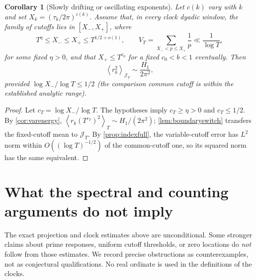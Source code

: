 \documentclass[11pt,reqno]{amsart}
\numberwithin{equation}{section}
\newtheorem{corollary}[theorem]{Corollary}
\newcommand{\av}[1]{\left\langle #1\right\rangle_T}
\newcommand{\avgJ}[1]{\left\langle #1\right\rangle_{\mathcal J_T}}
\begin{document}
\begin{corollary}[Slowly drifting or oscillating exponents]\label{cor:indexvariableleading}
Let $c(k)$ vary with $k$ and set $X_k=(\tau_k/2\pi)^{c(k)}$.
Assume that, in every clock dyadic window, the family of cutoffs
lies in $[X_-,X_+]$, where
\begin{equation}\label{eq:indexvarycond}
T^{\eta}\le X_-\le X_+\le T^{1/2+o(1)},
\qquad V_T=\sum_{X_-<p\le X_+}\frac1p\ll\frac1{\log T},
\end{equation}
for some fixed $\eta>0$, and that $X_+\le T^{c_0}$ for a fixed
$c_0<b<1$ eventually. Then
\begin{equation}\label{eq:indexvariableleading}
\avgJ{r_k^2}\sim\frac{H_1}{2\pi^2},
\end{equation}
provided $\log X_-/\log T\le1/2$ (the comparison common cutoff
is within the established analytic range).
\end{corollary}
\begin{proof}
Let $c_T=\log X_-/\log T$. The hypotheses imply
$c_T\ge\eta>0$ and $c_T\le1/2$.
By \cref{cor:varenergy}, $\av{r_k(T^{c_T})^2}\sim H_1/(2\pi^2)$;
\cref{lem:boundaryswitch} transfers the fixed-cutoff mean to
$\mathcal J_T$. By \cref{prop:indexfull}, the variable-cutoff
error has $L^2$ norm within $O((\log T)^{-1/2})$ of the common-cutoff
one, so its squared norm has the same equivalent.
\end{proof}




\section{What the spectral and counting arguments do not imply}
\label{sec:boundaries}
The exact projection and clock estimates above are unconditional. Some stronger
claims about prime responses, uniform cutoff thresholds, or zero locations do
\emph{not} follow from those estimates. We record precise obstructions as
counterexamples, not as conjectural qualifications. No real ordinate is used
in the definitions of the clocks.
\end{document}
